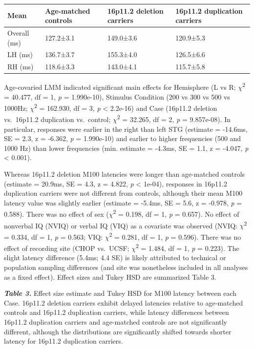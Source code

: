 \documentclass[]{article}
\begin{document}
\begin{longtable}[c]{@{}llll@{}}
\toprule
Mean & Age-matched controls & 16p11.2 deletion carriers & 16p11.2
duplication carriers\tabularnewline
\midrule
\endhead
Overall (ms) & 127.2±3.1 & 149.0±3.6 & 120.9±5.3\tabularnewline
LH (ms) & 136.7±3.7 & 155.3±4.0 & 126.5±6.6\tabularnewline
RH (ms) & 118.6±3.3 & 143.0±4.1 & 115.7±5.8\tabularnewline
\bottomrule
\end{longtable}

Age-covaried LMM indicated significant main effects for Hemisphere (L vs
R; \(\chi\)\textsuperscript{2} = 40.477, df = 1, \emph{p} = 1.990e-10),
Stimulus Condition (200 vs 300 vs 500 vs 1000Hz;
\(\chi\)\textsuperscript{2} = 162.930, df = 3, \emph{p} \textless{}
2.2e-16) and Case (16p11.2 deletion vs.~16p11.2 duplication vs.~control;
\(\chi\)\textsuperscript{2} = 32.265, df = 2, \emph{p} = 9.857e-08). In
particular, responses were earlier in the right than left STG (estimate
= -14.6ms, SE = 2.3, z = -6.362, \emph{p} = 1.990e-10) and earlier to
higher frequencies (500 and 1000 Hz) than lower frequencies (min.
estimate = -4.3ms, SE = 1.1, z = -4.047, \emph{p} \textless{} 0.001).

Whereas 16p11.2 deletion M100 latencies were longer than age-matched
controls (estimate = 20.9ms, SE = 4.3, z = 4.822, \emph{p} \textless{}
1e-04), responses in 16p11.2 duplication carriers were not different
from controls, although their mean M100 latency value was slightly
earlier (estimate = -5.4ms, SE = 5.6, z = -0.978, \emph{p} = 0.588).
There was no effect of sex (\(\chi\)\textsuperscript{2} = 0.198, df = 1,
\emph{p} = 0.657). No effect of nonverbal IQ (NVIQ) or verbal IQ (VIQ)
as a covariate was observed (NVIQ: \(\chi\)\textsuperscript{2} = 0.334,
df = 1, \emph{p} = 0.563; VIQ: \(\chi\)\textsuperscript{2} = 0.281, df =
1, \emph{p} = 0.596). There was no effect of recording site (CHOP
vs.~UCSF; \(\chi\)\textsuperscript{2} = 1.484, df = 1, \emph{p} =
0.223). The slight latency difference (5.4ms; 4.4 SE) is likely
attributed to technical or population sampling differences (and site was
nonetheless included in all analyses as a fixed effect). Effect sizes
and Tukey HSD are summarized Table 3.

\textbf{\emph{Table 3.}} Effect size estimate and Tukey HSD for M100
latency between each Case. 16p11.2 deletion carriers exhibit delayed
latencies relative to age-matched controls and 16p11.2 duplication
carriers, while latency differences between 16p11.2 duplication carriers
and age-matched controls are not significantly different, although the
distributions are significantly shifted towards shorter latency for
16p11.2 duplication carriers.
\end{document}
